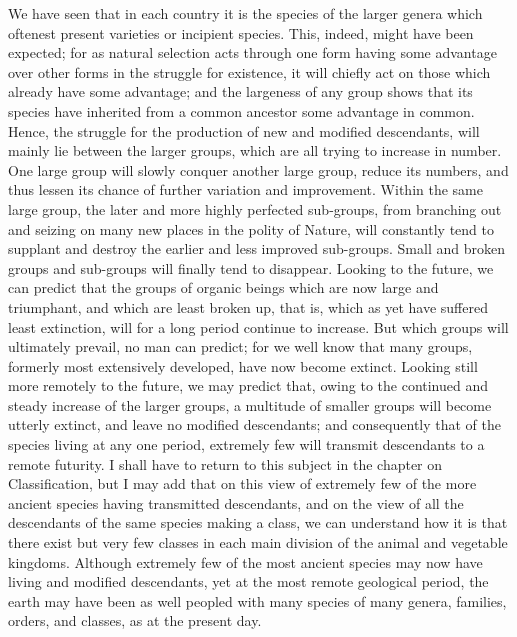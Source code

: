 \indent We have seen that in each country it is the species of the larger genera which oftenest present varieties or incipient species. This, indeed, might have been expected; for as natural selection acts through one form having some advantage over other forms in the struggle for existence, it will chiefly act on those which already have some advantage; and the largeness of any group shows that its species have inherited from a common ancestor some advantage in common.  Hence, the struggle for the production of new and modified descendants, will mainly lie between the larger groups, which are all trying to increase in number. One large group will slowly conquer another large group, reduce its numbers, and thus lessen its chance of further variation and improvement. Within the same large group, the later and more highly perfected sub-groups, from branching out and seizing on many new places in the polity of Nature, will constantly tend to supplant and destroy the earlier and less improved sub-groups. Small and broken groups and sub-groups will finally tend to disappear. Looking to the future, we can predict that the groups of organic beings which are now large and triumphant, and which are least broken up, that is, which as yet have suffered least extinction, will for a long period continue to increase. But which groups will ultimately prevail, no man can predict; for we well know that many groups, formerly most extensively developed, have now become extinct.  Looking still more remotely to the future, we may predict that, owing to the continued and steady increase of the larger groups, a multitude of smaller groups will become utterly extinct, and leave no modified descendants; and consequently that of the species living at any one period, extremely few will transmit descendants to a remote futurity. I shall have to return to this subject in the chapter on Classification, but I may add that on this view of extremely few of the more ancient species having transmitted descendants, and on the view of all the descendants of the same species making a class, we can understand how it is that there exist but very few classes in each main division of the animal and vegetable kingdoms. Although extremely few of the most ancient species may now have living and modified descendants, yet at the most remote geological period, the earth may have been as well peopled with many species of many genera, families, orders, and classes, as at the present day. \\

